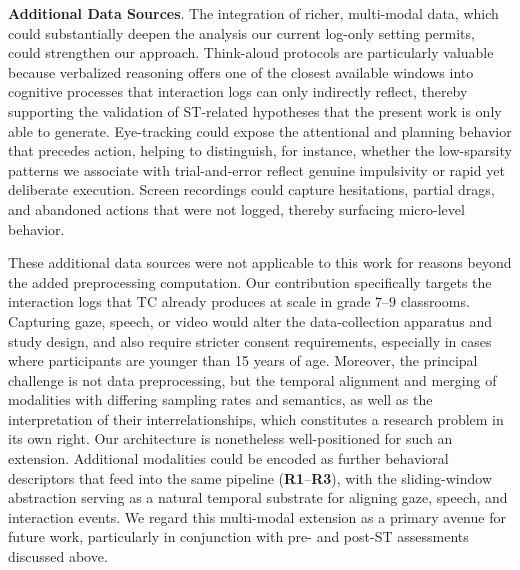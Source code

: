 \documentclass[letterpaper,journal]{IEEEtran}
\begin{document}
\noindent
\textbf{Additional Data Sources}.
The integration of richer, multi-modal data, which could substantially deepen the analysis our current log-only setting permits, could strengthen our approach.
Think-aloud protocols are particularly valuable because verbalized reasoning offers one of the closest available windows into cognitive processes that interaction logs can only indirectly reflect, thereby supporting the validation of ST-related hypotheses that the present work is only able to generate.
Eye-tracking could expose the attentional and planning behavior that precedes action, helping to distinguish, for instance, whether the low-sparsity patterns we associate with trial-and-error reflect genuine impulsivity or rapid yet deliberate execution.
Screen recordings could capture hesitations, partial drags, and abandoned actions that were not logged, thereby surfacing micro-level behavior.

These additional data sources were not applicable to this work for reasons beyond the added preprocessing computation.
Our contribution specifically targets the interaction logs that TC already produces at scale in grade $7$--$9$ classrooms.  Capturing gaze, speech, or video would alter the data-collection apparatus and study design, and also require stricter consent requirements, especially in cases where participants are younger than 15 years of age.
Moreover, the principal challenge is not data preprocessing, but the temporal alignment and merging of modalities with differing sampling rates and semantics, as well as the interpretation of their interrelationships, which constitutes a research problem in its own right.
Our architecture is nonetheless well-positioned for such an extension. Additional modalities could be encoded as further behavioral descriptors that feed into the same pipeline (\textbf{R1}--\textbf{R3}), with the sliding-window abstraction serving as a natural temporal substrate for aligning gaze, speech, and interaction events.
We regard this multi-modal extension as a primary avenue for future work, particularly in conjunction with pre- and post-ST assessments discussed above.
\end{document}
